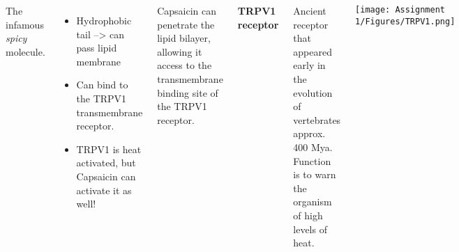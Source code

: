 \documentclass[a0paper,portrait,margin=0pt, colspace=36pt,subcolspace=0pt,blockverticalspace=36pt,innermargin=50pt]{tikzposter}
\begin{document}
\begin{columns}
{The infamous \textit{spicy} molecule. \\

\begin{itemize}
    \item Hydrophobic tail --> can pass lipid membrane
    \item Can bind to the TRPV1 transmembrane receptor.
    \item TRPV1 is heat activated, but Capsaicin can activate it as well!
\end{itemize}

\raggedright


Capsaicin can penetrate the lipid bilayer, allowing it access to the transmembrane binding site of the TRPV1 receptor.\\

\\

	\begin{center}
	\textbf{TRPV1 receptor}
	\end{center}
\raggedright
Ancient receptor that appeared early in the evolution of vertebrates approx. 400 Mya. \\
Function is to warn the organism of high levels of heat.

    \begin{center}
		\texttt{[image: Assignment 1/Figures/TRPV1.png]}
	\end{center}	

 }
 

\end{columns} 
%
%
%
%
\end{document}
